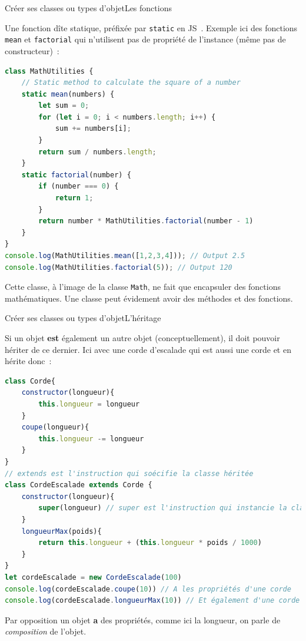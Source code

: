 \documentclass{beamer}
\begin{document}
    \begin{frame}[fragile]{Créer ses classes ou types d'objet}{Les fonctions}
        \begin{footnotesize}
            Une fonction dîte statique, préfixée par \lstinline{static} en JS~.
            Exemple ici des fonctions \lstinline{mean} et \lstinline{factorial} qui n'utilisent pas de propriété de l'instance (même pas de constructeur)~:
            \begin{lstlisting}[language=JavaScript,title={\scriptsize{Script JavaScript}},basicstyle=\tiny\ttfamily]
class MathUtilities {
    // Static method to calculate the square of a number
    static mean(numbers) {
        let sum = 0;
        for (let i = 0; i < numbers.length; i++) {
            sum += numbers[i];
        }
        return sum / numbers.length;
    }
    static factorial(number) {
        if (number === 0) {
            return 1;
        }
        return number * MathUtilities.factorial(number - 1)
    }
}
console.log(MathUtilities.mean([1,2,3,4])); // Output 2.5
console.log(MathUtilities.factorial(5)); // Output 120
            \end{lstlisting}
            Cette classe, à l'image de la classe \lstinline{Math}, ne fait que encapsuler des fonctions mathématiques.
            Une classe peut évidement avoir des méthodes et des fonctions.
        \end{footnotesize}
    \end{frame}

    \begin{frame}[fragile]{Créer ses classes ou types d'objet}{L'héritage}
        \begin{footnotesize}
            Si un objet \textbf{est} également un autre objet (conceptuellement), il doit pouvoir hériter de ce dernier.
            Ici avec une corde d'escalade qui est aussi une corde et en hérite donc~:
            \begin{lstlisting}[language=JavaScript,title={\scriptsize{Script JavaScript}},basicstyle=\tiny\ttfamily]
class Corde{
    constructor(longueur){
        this.longueur = longueur
    }
    coupe(longueur){
        this.longueur -= longueur
    }
}
// extends est l'instruction qui soécifie la classe héritée
class CordeEscalade extends Corde {
    constructor(longueur){
        super(longueur) // super est l'instruction qui instancie la classe mère
    }
    longueurMax(poids){
        return this.longueur + (this.longueur * poids / 1000)
    }
}
let cordeEscalade = new CordeEscalade(100)
console.log(cordeEscalade.coupe(10)) // A les propriétés d'une corde
console.log(cordeEscalade.longueurMax(10)) // Et également d'une corde d'escalade
            \end{lstlisting}
            Par opposition un objet \textbf{a} des propriétés, comme ici la longueur, on parle de \textit{composition} de l'objet.
        \end{footnotesize}
    \end{frame}
\end{document}
